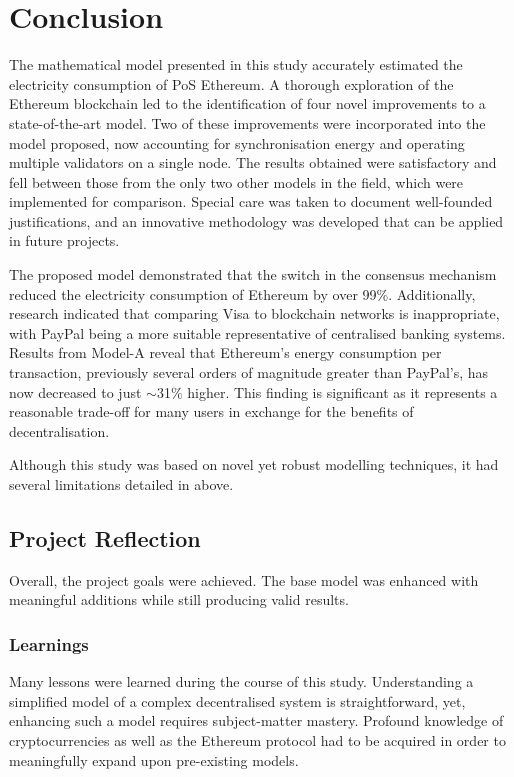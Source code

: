 \chapter{Conclusion}

The mathematical model presented in this study accurately estimated the electricity consumption of PoS Ethereum. A thorough exploration of the Ethereum blockchain led to the identification of four novel improvements to a state-of-the-art model. Two of these improvements were incorporated into the model proposed, now accounting for synchronisation energy and operating multiple validators on a single node. The results obtained were satisfactory and fell between those from the only two other models in the field, which were implemented for comparison. Special care was taken to document well-founded justifications, and an innovative methodology was developed that can be applied in future projects. 

The proposed model demonstrated that the switch in the consensus mechanism reduced the electricity consumption of Ethereum by over 99\%. Additionally, research indicated that comparing Visa to blockchain networks is inappropriate, with PayPal being a more suitable representative of centralised banking systems. Results from Model-A reveal that Ethereum's energy consumption per transaction, previously several orders of magnitude greater than PayPal's, has now decreased to just $\sim$31\% higher. This finding is significant as it represents a reasonable trade-off for many users in exchange for the benefits of decentralisation.  

Although this study was based on novel yet robust modelling techniques, it had several limitations detailed in  above.


\section{Project Reflection}

Overall, the project goals were achieved. The base model was enhanced with meaningful additions while still producing valid results.

\subsection{Learnings}

Many lessons were learned during the course of this study. Understanding a simplified model of a complex decentralised system is straightforward, yet, enhancing such a  model requires subject-matter mastery. Profound knowledge of cryptocurrencies as well as the Ethereum protocol had to be acquired in order to meaningfully expand upon pre-existing models.

